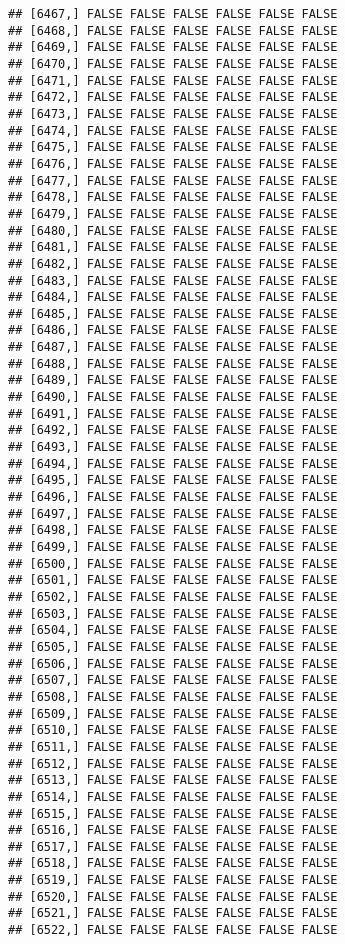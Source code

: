 \documentclass[
]{article}
\begin{document}
\begin{verbatim}
## [6467,] FALSE FALSE FALSE FALSE FALSE FALSE
## [6468,] FALSE FALSE FALSE FALSE FALSE FALSE
## [6469,] FALSE FALSE FALSE FALSE FALSE FALSE
## [6470,] FALSE FALSE FALSE FALSE FALSE FALSE
## [6471,] FALSE FALSE FALSE FALSE FALSE FALSE
## [6472,] FALSE FALSE FALSE FALSE FALSE FALSE
## [6473,] FALSE FALSE FALSE FALSE FALSE FALSE
## [6474,] FALSE FALSE FALSE FALSE FALSE FALSE
## [6475,] FALSE FALSE FALSE FALSE FALSE FALSE
## [6476,] FALSE FALSE FALSE FALSE FALSE FALSE
## [6477,] FALSE FALSE FALSE FALSE FALSE FALSE
## [6478,] FALSE FALSE FALSE FALSE FALSE FALSE
## [6479,] FALSE FALSE FALSE FALSE FALSE FALSE
## [6480,] FALSE FALSE FALSE FALSE FALSE FALSE
## [6481,] FALSE FALSE FALSE FALSE FALSE FALSE
## [6482,] FALSE FALSE FALSE FALSE FALSE FALSE
## [6483,] FALSE FALSE FALSE FALSE FALSE FALSE
## [6484,] FALSE FALSE FALSE FALSE FALSE FALSE
## [6485,] FALSE FALSE FALSE FALSE FALSE FALSE
## [6486,] FALSE FALSE FALSE FALSE FALSE FALSE
## [6487,] FALSE FALSE FALSE FALSE FALSE FALSE
## [6488,] FALSE FALSE FALSE FALSE FALSE FALSE
## [6489,] FALSE FALSE FALSE FALSE FALSE FALSE
## [6490,] FALSE FALSE FALSE FALSE FALSE FALSE
## [6491,] FALSE FALSE FALSE FALSE FALSE FALSE
## [6492,] FALSE FALSE FALSE FALSE FALSE FALSE
## [6493,] FALSE FALSE FALSE FALSE FALSE FALSE
## [6494,] FALSE FALSE FALSE FALSE FALSE FALSE
## [6495,] FALSE FALSE FALSE FALSE FALSE FALSE
## [6496,] FALSE FALSE FALSE FALSE FALSE FALSE
## [6497,] FALSE FALSE FALSE FALSE FALSE FALSE
## [6498,] FALSE FALSE FALSE FALSE FALSE FALSE
## [6499,] FALSE FALSE FALSE FALSE FALSE FALSE
## [6500,] FALSE FALSE FALSE FALSE FALSE FALSE
## [6501,] FALSE FALSE FALSE FALSE FALSE FALSE
## [6502,] FALSE FALSE FALSE FALSE FALSE FALSE
## [6503,] FALSE FALSE FALSE FALSE FALSE FALSE
## [6504,] FALSE FALSE FALSE FALSE FALSE FALSE
## [6505,] FALSE FALSE FALSE FALSE FALSE FALSE
## [6506,] FALSE FALSE FALSE FALSE FALSE FALSE
## [6507,] FALSE FALSE FALSE FALSE FALSE FALSE
## [6508,] FALSE FALSE FALSE FALSE FALSE FALSE
## [6509,] FALSE FALSE FALSE FALSE FALSE FALSE
## [6510,] FALSE FALSE FALSE FALSE FALSE FALSE
## [6511,] FALSE FALSE FALSE FALSE FALSE FALSE
## [6512,] FALSE FALSE FALSE FALSE FALSE FALSE
## [6513,] FALSE FALSE FALSE FALSE FALSE FALSE
## [6514,] FALSE FALSE FALSE FALSE FALSE FALSE
## [6515,] FALSE FALSE FALSE FALSE FALSE FALSE
## [6516,] FALSE FALSE FALSE FALSE FALSE FALSE
## [6517,] FALSE FALSE FALSE FALSE FALSE FALSE
## [6518,] FALSE FALSE FALSE FALSE FALSE FALSE
## [6519,] FALSE FALSE FALSE FALSE FALSE FALSE
## [6520,] FALSE FALSE FALSE FALSE FALSE FALSE
## [6521,] FALSE FALSE FALSE FALSE FALSE FALSE
## [6522,] FALSE FALSE FALSE FALSE FALSE FALSE

\end{verbatim}
\end{document}
